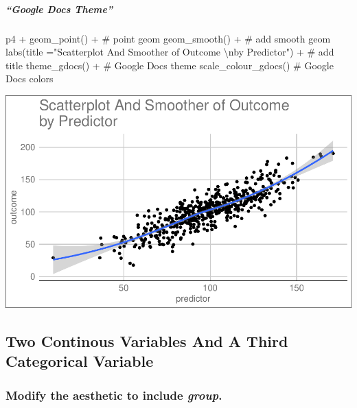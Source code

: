 \documentclass[12pt,]{article}
\newenvironment{Shaded}{}{}
\newcommand{\CharTok}[1]{\textcolor[rgb]{0.00,0.50,0.50}{#1}}
\newcommand{\CommentTok}[1]{\textcolor[rgb]{0.00,0.50,0.00}{#1}}
\newcommand{\DataTypeTok}[1]{#1}
\newcommand{\KeywordTok}[1]{\textcolor[rgb]{0.00,0.00,1.00}{#1}}
\newcommand{\NormalTok}[1]{#1}
\newcommand{\OperatorTok}[1]{#1}
\newcommand{\StringTok}[1]{\textcolor[rgb]{0.00,0.50,0.50}{#1}}
\let\oldsubparagraph\subparagraph
\renewcommand{\subparagraph}[1]{\oldsubparagraph{#1}\mbox{}}
\begin{document}
\hypertarget{google-docs-theme}{%
\subparagraph{``Google Docs Theme''}\label{google-docs-theme}}

\begin{Shaded}
\begin{Highlighting}[]
\NormalTok{p4 }\OperatorTok{+}\StringTok{ }
\StringTok{  }\KeywordTok{geom_point}\NormalTok{() }\OperatorTok{+}\StringTok{ }\CommentTok{# point geom}
\StringTok{  }\KeywordTok{geom_smooth}\NormalTok{() }\OperatorTok{+}\StringTok{ }\CommentTok{# add smooth geom}
\StringTok{  }\KeywordTok{labs}\NormalTok{(}\DataTypeTok{title =}\StringTok{"Scatterplot And Smoother of Outcome }\CharTok{\textbackslash{}n}\StringTok{by Predictor"}\NormalTok{) }\OperatorTok{+}\StringTok{ }\CommentTok{# add title}
\StringTok{  }\KeywordTok{theme_gdocs}\NormalTok{() }\OperatorTok{+}\StringTok{ }\CommentTok{# Google Docs theme}
\StringTok{  }\KeywordTok{scale_colour_gdocs}\NormalTok{() }\CommentTok{# Google Docs colors}
\end{Highlighting}
\end{Shaded}

\includegraphics{introduction-to-ggplot2_files/figure-latex/unnamed-chunk-31-1.pdf}

\hypertarget{two-continous-variables-and-a-third-categorical-variable}{%
\subsection{Two Continous Variables And A Third Categorical
Variable}\label{two-continous-variables-and-a-third-categorical-variable}}

\hypertarget{modify-the-aesthetic-to-include-group.}{%
\subsubsection{\texorpdfstring{Modify the aesthetic to include
\emph{group}.}{Modify the aesthetic to include group.}}\label{modify-the-aesthetic-to-include-group.}}
\end{document}
